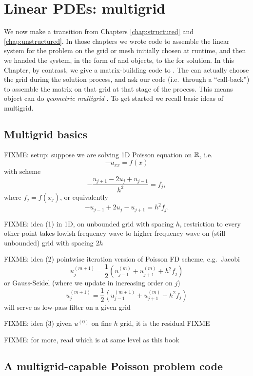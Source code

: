 
\chapter{Linear PDEs: multigrid}
\label{chap:multigrid}

We now make a transition from Chapters \ref{chap:structured} and \ref{chap:unstructured}.  In those chapters we wrote code to assemble the linear system for the problem on the grid or mesh initially chosen at runtime, and then we handed the system, in the form of \pMat and \pVec objects, to the \pKSP for solution.  In this Chapter, by contrast, we give a matrix-building code to \pKSP.  The \pKSP can actually choose the grid during the solution process, and ask our code (i.e.~through a ``call-back'') to assemble the matrix on that grid at that stage of the process.  This means \PETSc \pKSP object can do \emph{geometric multigrid} \citep{Briggsetal2000}.  To get started we recall basic ideas of multigrid.


\section{Multigrid basics}

FIXME: setup: suppose we are solving 1D Poisson equation on $\mathbb{R}$, i.e.
    $$- u_{xx} = f(x)$$
with scheme
    $$- \frac{u_{j+1} - 2 u_j + u_{j-1}}{h^2} = f_j,$$
where $f_j = f(x_j)$, or equivalently
    $$- u_{j-1} + 2 u_j - u_{j+1} = h^2 f_j.$$

FIXME: idea (1) in 1D, on unbounded grid with spacing $h$, restriction to every other point takes lowish frequency wave to higher frequency wave on (still unbounded) grid with spacing $2h$

FIXME: idea (2) pointwise iteration version of Poisson FD scheme, e.g.~Jacobi
   $$u_j^{(m+1)} = \frac{1}{2} \left(u_{j-1}^{(m)} + u_{j+1}^{(m)} + h^2 f_j\right) $$
or Gauss-Seidel (where we update in increasing order on $j$)
   $$u_j^{(m+1)} = \frac{1}{2} \left(u_{j-1}^{(m+1)} + u_{j+1}^{(m)} + h^2 f_j\right) $$
will serve as low-pass filter on a given grid

FIXME: idea (3) given $u^{(0)}$ on fine $h$ grid, it is the residual FIXME

FIXME: for more, read \citep{Briggsetal2000} which is at same level as this book


\section{A multigrid-capable Poisson problem code}

